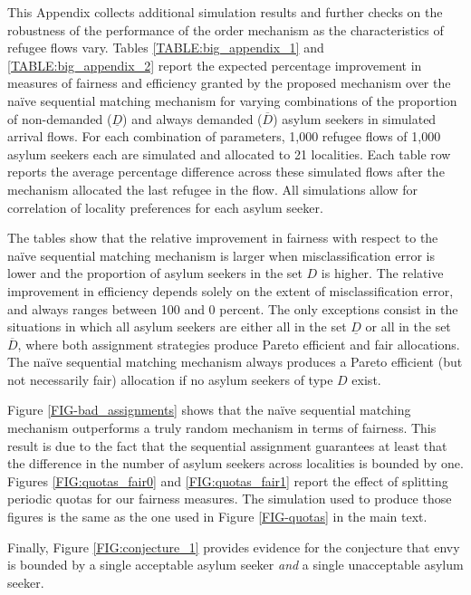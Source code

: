 \documentclass[12pt,fleqn]{article}
\begin{document}
This Appendix collects additional simulation results and further checks on the robustness of the performance of the order mechanism as the characteristics of refugee flows vary. Tables \ref{TABLE:big_appendix_1} and \ref{TABLE:big_appendix_2} report the expected percentage improvement in measures of fairness and efficiency granted by the proposed mechanism over the na\"{i}ve sequential matching mechanism for varying combinations of the proportion of non-demanded ($\underline{D}$) and always demanded ($\overline{D}$) asylum seekers in simulated arrival flows. For each combination of parameters, 1,000 refugee flows of 1,000 asylum seekers each are simulated and allocated to 21 localities. Each table row reports the average percentage difference across these simulated flows after the mechanism allocated the last refugee in the flow. All simulations allow for correlation of locality preferences for each asylum seeker.

The tables show that the relative improvement in fairness with respect to the na\"{i}ve sequential matching mechanism is larger when misclassification error is lower and the proportion of asylum seekers in the set $D$ is higher. The relative improvement in efficiency depends solely on the extent of misclassification error, and always ranges between 100 and 0 percent. The only exceptions consist in the situations in which all asylum seekers are either all in the set $\underline{D}$ or all in the set $\overline{D}$, where both assignment strategies produce Pareto efficient and fair allocations. The na\"{i}ve sequential matching mechanism always produces a Pareto efficient (but not necessarily fair) allocation if no asylum seekers of type $D$ exist.

Figure \ref{FIG-bad_assignments} shows that the na\"{i}ve sequential matching mechanism outperforms a truly random mechanism in terms of fairness. This result is due to the fact that the sequential assignment guarantees at least that the difference in the number of asylum seekers across localities is bounded by one. Figures \ref{FIG:quotas_fair0} and \ref{FIG:quotas_fair1} report the effect of splitting periodic quotas for our fairness measures. The simulation used to produce those figures is the same as the one used in Figure \ref{FIG-quotas} in the main text.

Finally, Figure \ref{FIG:conjecture_1} provides evidence for the conjecture that envy is bounded by a single acceptable asylum seeker \emph{and} a single unacceptable asylum seeker.
\end{document}
